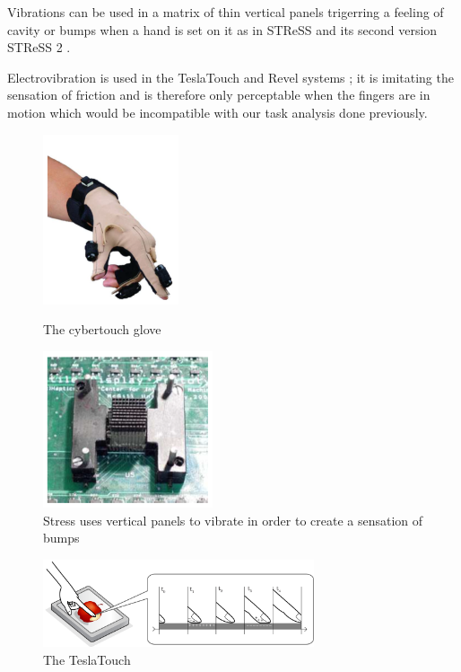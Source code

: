 Vibrations can be used in a matrix of thin vertical panels trigerring a
feeling of cavity or bumps when a hand is set on it as in STReSS and its second version STReSS 2 \cite{wang2006compact}.

Electrovibration is used in the TeslaTouch and Revel systems \cite{bau2010teslatouch, bau2012revel}; it is imitating the sensation of friction and is therefore only perceptable when the fingers are in motion which would be incompatible with our task analysis done previously.

\begin{figure}[!ht]
	\begin{minipage}[c]{.45\linewidth}
		\centering
		\includegraphics[height=5cm]{figures/cybertouch.png}
	\caption{The cybertouch glove}
	\end{minipage}
	\begin{minipage}[c]{.45\linewidth}
		\centering
		\includegraphics[width=5cm]{figures/stress.png}
		\caption{Stress uses vertical panels to vibrate in order to create a sensation of bumps}
	\end{minipage}
\end{figure}

\begin{figure}[!ht]
	\centering
	\includegraphics[width=8cm]{figures/teslatouch.png}
	\caption{The TeslaTouch}
\end{figure}



